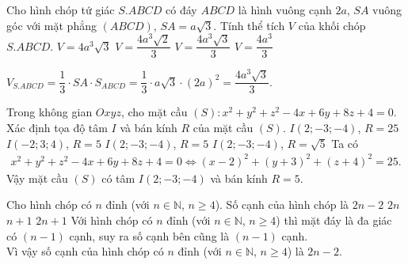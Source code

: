 \begin{ex}%
 Cho hình chóp tứ giác $S.ABCD$ có đáy $ABCD$ là hình vuông cạnh $2a$, $SA$ vuông góc với mặt phẳng $(ABCD)$, $SA=a\sqrt{3}$. Tính thể tích $V$ của khối chóp $S.ABCD$.
 \choice
  {$V=4a^3\sqrt{3}$}
  {$V=\dfrac{4a^3\sqrt{2}}{3}$}
  {\True $V=\dfrac{4a^3\sqrt{3}}{3}$}
  {$V=\dfrac{4a^3}{3}$}
 \loigiai
  {
  \immini
  {$V_{S.ABCD}=\dfrac{1}{3}\cdot SA\cdot S_{ABCD}=\dfrac{1}{3}\cdot a\sqrt3\cdot (2a)^2=\dfrac{4a^3\sqrt3}{3}$.
  }
  {}
  }
\end{ex}

\begin{ex}%
 Trong không gian $Oxyz$, cho mặt cầu $(S)\colon x^2+y^2+z^2-4x+6y+8z+4=0$. Xác định tọa độ tâm $I$ và bán kính $R$ của mặt cầu $(S)$.
 \choice
  {$I(2;-3;-4)$, $R=25$}
  {$I(-2;3;4)$, $R=5$}
  {\True $I(2;-3;-4)$, $R=5$}
  {$I(2;-3;-4)$, $R=\sqrt{5}$}
 \loigiai
  {
  Ta có
  \begin{eqnarray*}
   x^2+y^2+z^2-4x+6y+8z+4=0 \Leftrightarrow (x-2)^2+(y+3)^2+(z+4)^2=25.
  \end{eqnarray*}
  Vậy mặt cầu $(S)$ có tâm $I(2;-3;-4)$ và bán kính $R=5$.
  }
\end{ex}

\begin{ex}%
 Cho hình chóp có $n$ đỉnh (với $n\in\mathbb{N}$, $n\geq 4$). Số cạnh của hình chóp là
 \choice
  {\True $2n-2$}
  {$2n$}
  {$n+1$}
  {$2n+1$}
 \loigiai
  {
  Với hình chóp có $n$ đỉnh (với $n\in\mathbb{N}$, $n\geq 4$) thì mặt đáy là đa giác có $(n-1)$ cạnh, suy ra số cạnh bên cũng là $(n-1)$ cạnh.\\
  Vì vậy số cạnh của hình chóp có $n$ đỉnh (với $n\in\mathbb{N}$, $n\geq 4$) là $2n-2$.
  }
\end{ex}

